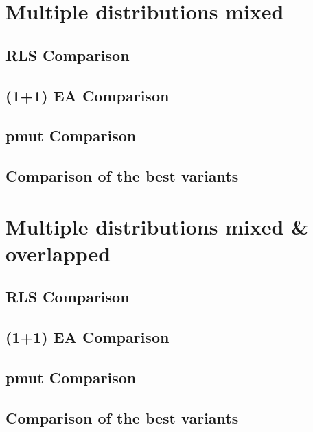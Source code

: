 \section{Multiple distributions mixed}
\subsection{RLS Comparison}
\subsection{(1+1) EA Comparison}
\subsection{pmut Comparison}
\subsection{Comparison of the best variants}

\section{Multiple distributions mixed \& overlapped}
\subsection{RLS Comparison}
\subsection{(1+1) EA Comparison}
\subsection{pmut Comparison}
\subsection{Comparison of the best variants}